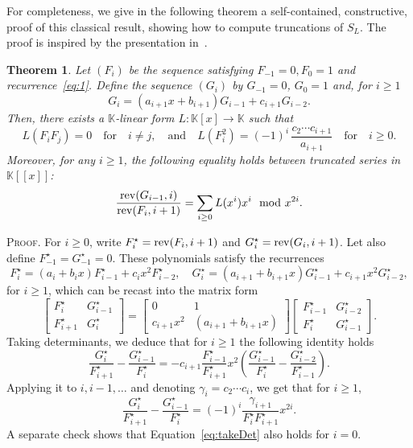 \documentclass{elsart}
\def\F {\ensuremath{\mathbb{F}}}
\def\K {\ensuremath{\mathbb{K}}}
\newtheorem{Theorem}{Theorem}
\def\proof{\textsc{Proof.} }
\begin{document}
For completeness, we give in the following theorem a self-contained,
constructive, proof of this classical result, showing how to compute
truncations of $S_L$. The proof is inspired by the presentation
in~\cite[Section~3]{Flajolet80}.

\begin{Theorem}
Let $(F_i)$ be the sequence satisfying $F_{-1} = 0, F_0=1$ and recurrence~\eqref{eq:1}.
 Define the sequence $(G_i)$ by  $G_{-1} = 0$, $G_0=1$ and, for $i \ge 1$
  \begin{equation*} \label{eq:2}
   G_{i} = (a_{i+1} x+b_{i+1}) G_{i-1} + c_{i+1} G_{i-2}.
  \end{equation*}
Then, there exists a $\K$-linear form $L: \K[x] \to\K$ such that
	\begin{equation}\label{eq:L}
		L(F_i F_j) =0 \quad\text{for}\quad i \neq j , \quad \text{and} \quad L(F_i^2) = (-1)^i \, \frac{c_2\cdots c_{i+1}}{a_{i+1}} \quad\text{for}\quad i \ge 0.
	\end{equation}
Moreover, for any $i \geq 1$, the following equality holds between truncated series in
$\K[[x]]$:
	\begin{equation} \label{eq:momentSeries}
	\frac{{\rm rev}(G_{i-1},i)}{{\rm rev}(F_i,i+1)} =   \sum_{i \ge 0} L(x^i) x^i  \mod x^{2i}.
	\end{equation}
\end{Theorem}

\proof For $i\ge 0$, write $F_i^\star={{\rm rev}(F_i,i+1)}$ and
$G_i^\star={{\rm rev}(G_i,i+1)}$. Let also define $F_{-1}^\star = G_{-1}^\star = 0$. These polynomials satisfy the recurrences
$$F_{i}^\star = (a_{i}+b_{i}x) F^\star_{i-1} + c_{i}x^2 F^\star_{i-2},  \quad G_{i}^\star = 
(a_{i+1} +b_{i+1}x) G^\star_{i-1} + c_{i+1}x^2 G^\star_{i-2},$$
for $i \ge 1$, which 
can be recast into the matrix form
$$\left [ \begin{matrix}  F^\star_{i} & G^\star_{i-1} \\F^\star_{i+1} & 
G^\star_{i}\end{matrix}\right ]
= \left [ \begin{matrix}  0 & 1 \\ c_{i+1}x^2 & (a_{i+1}+b_{i+1}x)  \end{matrix}\right ]
  \left [ \begin{matrix}  F^\star_{i-1} & G^\star_{i-2} \\F^\star_{i} & 
G^\star_{i-1}\end{matrix}\right ].$$
Taking determinants, we deduce that for $i \ge 1$ the following identity holds
$$
\frac{G^\star_{i}}{F^\star_{i+1}}-\frac{G^\star_{i-1}}{F^\star_{i}}
= -c_{i+1} \frac{F^\star_{i-1}}{F^\star_{i+1}} x^2 \left (
\frac{G^\star_{i-1}}{F^\star_{i}}-\frac{G^\star_{i-2}}{F^\star_{i-1}}
\right ).
$$
Applying it to $i,i-1,\ldots$ and denoting $\gamma_i = c_2 \cdots c_i$, we get  that for $i\ge 1$,
\begin{equation} \label{eq:takeDet}
 \frac{G^\star_{i}}{F^\star_{i+1}} -  \frac{G^\star_{i-1}}{F^\star_{i}} = (-1)^i 
\frac{\gamma_{i+1}}{F^\star_{i} F^\star_{i+1}} x^{2i}.
\end{equation}
A separate check shows that Equation~\eqref{eq:takeDet} also holds for $i=0$. 
\end{document}
